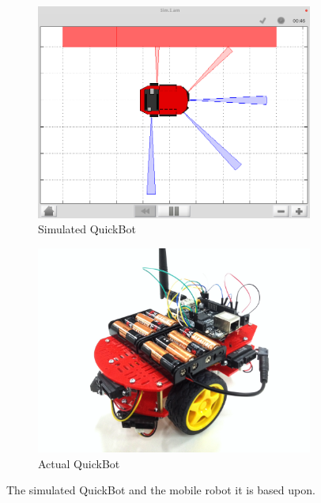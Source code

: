 \documentclass[10pt]{article}
\begin{document}
\begin{figure}[t]
  \centering
  \begin{subfigure}{0.45\textwidth}
    \includegraphics[width=\textwidth]{images/simiam-quickbot.png}
    \caption{Simulated QuickBot}
    \label{fig:simulated-quickbot}
  \end{subfigure}
  \begin{subfigure}{0.45\textwidth}
    \includegraphics[width=\textwidth]{images/quickbot-red.png}
    \caption{Actual QuickBot}
    \label{fig:actual-quickbot}
  \end{subfigure}
  \caption{The simulated QuickBot and the mobile robot it is based upon.} 
  \label{fig:quickbot}
\end{figure}
\end{document}
